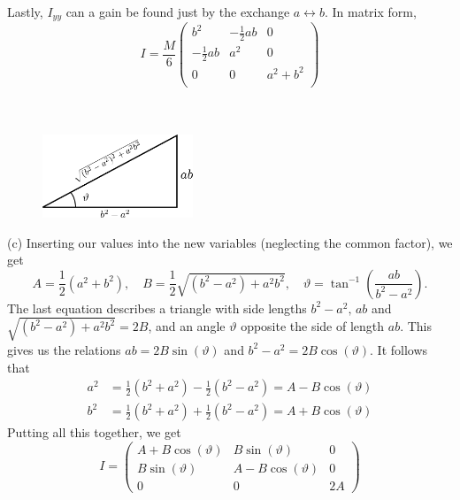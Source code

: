 \documentclass{article}
\begin{document}
        Lastly, $I_{yy}$ can a gain be found just by the exchange $a \leftrightarrow b$. In matrix form,
        \begin{equation*}
            I = \frac{M}{6}
            \begin{pmatrix*}
                b^2 & -\frac{1}{2} ab & 0 \\
                -\frac{1}{2} ab & a^2 & 0 \\
                0 & 0 & a^2 + b^2 \\
            \end{pmatrix*}
        \end{equation*}
        \\ \\
        \begin{figure}
            \includegraphics[width=0.4\textwidth]{figures/exercise_1_triangle2.pdf}
        \end{figure}
        (c) Inserting our values into the new variables (neglecting the common factor), we get
        \begin{equation*}
            A = \frac{1}{2}(a^2 + b^2), \quad B = \frac{1}{2}\sqrt{(b^2 - a^2) +a^2b^2}, \quad \vartheta = \tan^{-1}\left( \frac{ab}{b^2 - a^2} \right).
        \end{equation*} 
        \newpage %
        The last equation describes a triangle with side lengths $b^2 - a^2, \, ab$ and $\sqrt{(b^2 - a^2) +a^2b^2} = 2B$, and an angle $\vartheta$ opposite the side of length $ab$. This gives us the relations $ab=2 B \sin(\vartheta)$ and $b^2 - a^2 = 2B \cos(\vartheta)$. It follows that
        \begin{align*}
            a^2 &= \frac{1}{2}(b^2 + a^2)  - \frac{1}{2}(b^2 - a^2) = A - B \cos(\vartheta) \\
        b^2 &= \frac{1}{2}(b^2 + a^2)  + \frac{1}{2}(b^2 - a^2) = A + B \cos(\vartheta)
        \end{align*}
        Putting all this together, we get 
        \begin{equation*}
            I =
            \begin{pmatrix*}
                A + B\cos(\vartheta) & B \sin(\vartheta) & 0 \\
                B \sin(\vartheta) & A - B\cos(\vartheta) & 0 \\
                0 & 0 & 2A
            \end{pmatrix*}
        \end{equation*}
\end{document}
